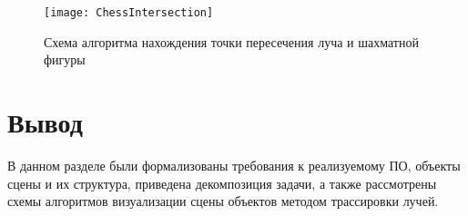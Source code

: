 \begin{figure}[H]
	\centering
	\texttt{[image: ChessIntersection]}
	\caption{Схема алгоритма нахождения точки пересечения луча и шахматной фигуры}
	\label{fig:ChessIntersection}
\end{figure}

\section*{Вывод}
В данном разделе были формализованы требования к реализуемому ПО, объекты сцены и их структура, приведена декомпозиция задачи, а также рассмотрены схемы алгоритмов визуализации сцены объектов методом трассировки лучей.

\clearpage
